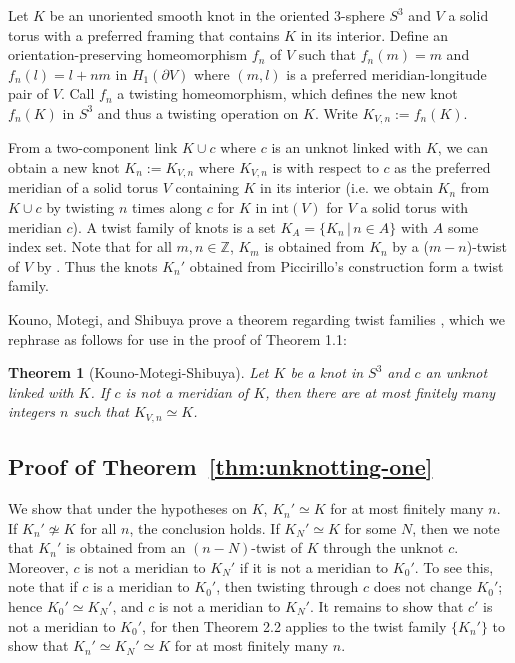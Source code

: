 \documentclass[11pt,usenames,dvipsnames,reqno]{amsart}
\newtheorem{theorem}{Theorem}
\numberwithin{theorem}{section}
\theoremstyle{ex}
\theoremstyle{rem}
\begin{document}
Let $K$ be an unoriented smooth knot in the oriented 3-sphere $S^3$ and $V$ a solid torus with a preferred framing that contains $K$ in its interior. Define an orientation-preserving homeomorphism $f_n$ of $V$ such that $f_n(m)=m$ and  $f_n(l)=l+nm$ in $H_1(\partial V)$ where $(m, l)$ is a preferred meridian-longitude pair of $V$. Call $f_n$ a twisting homeomorphism, which defines the new knot $f_n(K)$ in $S^3$ and thus a twisting operation on $K$. Write $K_{V,n} := f_n(K)$.

From a two-component link $K\cup c$ where $c$ is an unknot linked with $K$, we can obtain a new knot $K_n := K_{V,n}$ where $K_{V,n}$ is with respect to $c$ as the preferred meridian of a solid torus $V$ containing $K$ in its interior (i.e. we obtain $K_n$ from $K\cup c$ by twisting $n$ times along $c$ for $K$ in $\mathrm{int}(V)$ for $V$ a solid torus with meridian $c$). A twist family of knots is a set $K_A=\{K_n \,|\, n \in A\}$ with $A$ some index set. Note that for all $m, n\in\mathbb{Z}$,  $K_m$ is obtained from $K_n$ by a ($m-n$)-twist of $V$ by \cite[Remark 2.2]{twisting-knot-types}. Thus the knots $K_n'$ obtained from Piccirillo's construction form a twist family. 

Kouno, Motegi, and Shibuya prove a theorem regarding twist families \cite[Theorem 3.2]{twisting-knot-types}, which we rephrase as follows for use in the proof of Theorem 1.1:

\begin{theorem}[Kouno-Motegi-Shibuya] Let $K$ be a knot in $S^3$ and $c$ an unknot linked with $K$. If $c$ is not a meridian of $K$, then there are at most finitely many integers $n$ such that $K_{V,n}\simeq K$. 
\end{theorem}

\subsection{Proof of Theorem~\ref{thm:unknotting-one}} We show that under the hypotheses on $K$, $K_n'\simeq K$ for at most finitely many $n$. If $K_n'\not\simeq K$ for all $n$, the conclusion holds. If $K_N'\simeq K$ for some $N$, then we note that $K_n'$ is obtained from an $(n-N)$-twist of $K$ through the unknot $c$. Moreover, $c$ is not a meridian to $K_N'$ if it is not a meridian to $K_0'$. To see this, note that if $c$ is a meridian to $K_0'$, then twisting through $c$ does not change $K_0'$; hence $K_0'\simeq K_N'$, and $c$ is not a meridian to $K_N'$. It remains to show that $c'$ is not a meridian to $K_0'$, for then Theorem 2.2 applies to the twist family $\{K_n'\}$ to show that $K_n'\simeq K_N'\simeq K$ for at most finitely many $n$. 
\end{document}
